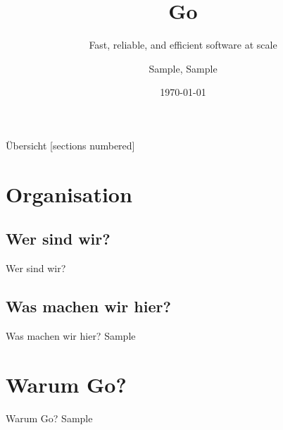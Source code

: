 

\usepackage{tikz}
\usepackage{hyperref}
\hypersetup{
	colorlinks=true,
	linkcolor=darkgray,
	urlcolor=blue,
}


\title{Go}
\subtitle{Fast, reliable, and efficient software at scale}
\date{\today}
\author{Sample, Sample}


\maketitle


\begin{frame}{Übersicht}
	[sections numbered]
	\tableofcontents[hideallsubsections]
\end{frame}



\section{Organisation}

\subsection{Wer sind wir?}
\begin{frame}{Wer sind wir?}

\end{frame}

\subsection{Was machen wir hier?}
\begin{frame}{Was machen wir hier?}
	Sample
\end{frame}



\section{Warum Go?}
\begin{frame}{Warum Go?}
	Sample
\end{frame}


